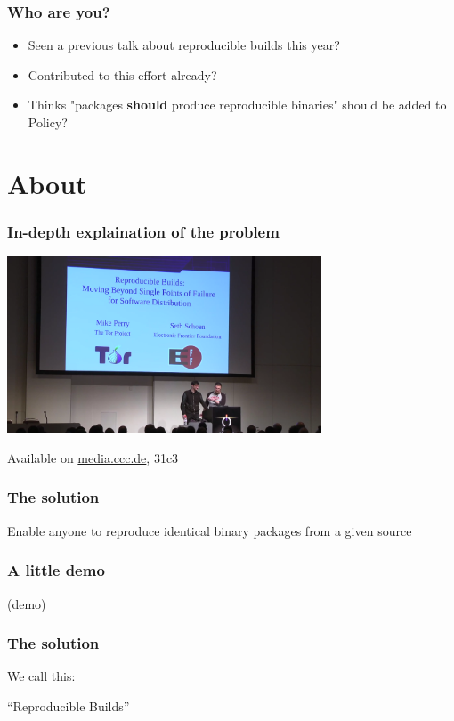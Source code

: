 \documentclass[14pt]{beamer}
\begin{document}
\begin{frame}
 \frametitle{Who are you?}
 \begin{itemize}
  \item Seen a previous talk about reproducible builds this year?
  \item<2-3> Contributed to this effort already?
  \item<3> Thinks "packages \textbf{should} produce reproducible binaries"
    should be added to Policy?
 \end{itemize}
\end{frame}

\section{About}

\begin{frame}
 \frametitle{In-depth explaination of the problem}

 \begin{center}
  \includegraphics[width=0.7\textwidth]{images/31c3.png}

  Available on \url{media.ccc.de}, 31c3
 \end{center}
\end{frame}

\begin{frame}
 \frametitle{The solution}

 \begin{center}
 \Large{
 Enable anyone to reproduce
 identical binary packages
 from a given source}
\end{center}
\end{frame}


\begin{frame}
 \frametitle{A little demo}

  (demo)
\end{frame}


\begin{frame}
 \frametitle{The solution}

 \begin{center}
 We call this:

 \Huge{ “Reproducible Builds” }
 \end{center}
\end{frame}
\end{document}
